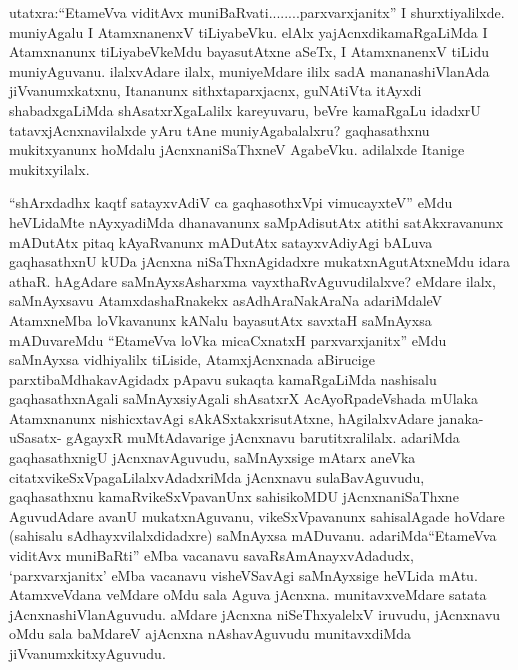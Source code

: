 
\begin{artha}
utatxra:\ndash  ``EtameVva viditAvx muniBaRvati........parxvarxjanitx'' I shurxtiyalilxde. muniyAgalu I AtamxnanenxV tiLiyabeVku. elAlx yajAcnxdikamaRgaLiMda I Atamxnanunx tiLiyabeVkeMdu bayasutAtxne aSeTx, I AtamxnanenxV tiLidu muniyAguvanu. ilalxvAdare ilalx, muniyeMdare ililx sadA mananashiVlanAda jiVvanumxkatxnu, Itananunx sithxtaparxjacnx, guNAtiVta itAyxdi shabadxgaLiMda shAsatxrXgaLalilx kareyuvaru, beVre kamaRgaLu idadxrU tatavxjAcnxnavilalxde yAru tAne muniyAgabalalxru? gaqhasathxnu mukitxyanunx hoMdalu jAcnxnaniSaThxneV AgabeVku. adilalxde Itanige mukitxyilalx.
\end{artha}


\begin{artha}
``shArxdadhx kaqtf satayxvAdiV ca gaqhasothxV\s pi vimucayxteV'' eMdu heVLidaMte nAyxyadiMda dhanavanunx saMpAdisutAtx atithi satAkxravanunx mADutAtx pitaq kAyaRvanunx mADutAtx satayxvAdiyAgi bALuva gaqhasathxnU kUDa jAcnxna niSaThxnAgidadxre mukatxnAgutAtxneMdu idara athaR. hAgAdare saMnAyxsAsharxma vayxthaRvAguvudilalxve? eMdare ilalx, saMnAyxsavu AtamxdashaRnakekx asAdhAraNakAraNa adariMdaleV AtamxneMba loVkavanunx kANalu bayasutAtx savxtaH saMnAyxsa mADuvareMdu ``EtameVva loVka micaCxnatxH parxvarxjanitx'' eMdu saMnAyxsa vidhiyalilx tiLiside, AtamxjAcnxnada aBirucige parxtibaMdhakavAgidadx pApavu sukaqta kamaRgaLiMda nashisalu gaqhasathxnAgali saMnAyxsiyAgali shAsatxrX AcAyoRpadeVshada mUlaka Atamxnanunx nishicxtavAgi sAkASxtakxrisutAtxne, hAgilalxvAdare janaka- uSasatx- gAgayxR muMtAdavarige jAcnxnavu barutitxralilalx. adariMda gaqhasathxnigU jAcnxnavAguvudu, saMnAyxsige mAtarx aneVka citatxvikeSxVpagaLilalxvAdadxriMda jAcnxnavu sulaBavAguvudu, gaqhasathxnu kamaRvikeSxVpavanUnx sahisikoMDU jAcnxnaniSaThxne AguvudAdare avanU mukatxnAguvanu, vikeSxVpavanunx sahisalAgade hoVdare (sahisalu sAdhayxvilalxdidadxre) saMnAyxsa mADuvanu. adariMda\break ``EtameVva viditAvx muniBaRti'' eMba vacanavu savaRsAmAnayxvAdadudx, `parxvarxjanitx' eMba vacanavu visheVSavAgi saMnAyxsige heVLida mAtu. AtamxveVdana veMdare oMdu sala Aguva jAcnxna. munitavx\-veMdare satata jAcnxnashiVlanAguvudu. aMdare jAcnxna niSeThxyalelxV iruvudu, jAcnxnavu oMdu sala baMdareV ajAcnxna nAshavAguvudu munitavxdiMda jiVvanumxkitxyAguvudu.
\end{artha}

